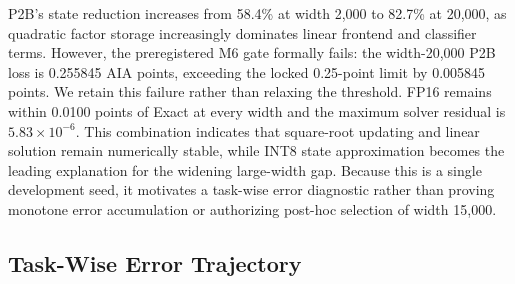 \documentclass[runningheads]{llncs}
\begin{document}
\begin{table}
\caption{Train-only width scaling on one CIFAR development stream. State is
total persistent MiB. The gap is Exact minus P2B validation AIA.}
\label{tab:width-scaling}
\centering
\small
{}
\end{table}

P2B's state reduction increases from 58.4\% at width 2,000 to 82.7\% at
20,000, as quadratic factor storage increasingly dominates linear frontend
and classifier terms. However, the preregistered M6 gate formally fails:
the width-20,000 P2B loss is 0.255845 AIA points, exceeding the locked
0.25-point limit by 0.005845 points. We retain this failure rather than
relaxing the threshold. FP16 remains within 0.0100 points of Exact at every
width and the maximum solver residual is $5.83\times10^{-6}$. This combination
indicates that square-root updating and linear solution remain numerically
stable, while INT8 state approximation becomes the leading explanation for
the widening large-width gap. Because this is a single development seed, it
motivates a task-wise error diagnostic rather than proving monotone error
accumulation or authorizing post-hoc selection of width 15,000.

\subsection{Task-Wise Error Trajectory}
\end{document}

